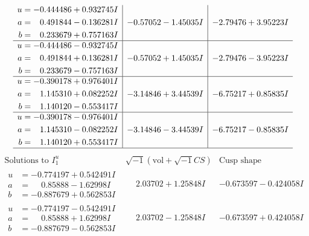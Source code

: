 \documentclass[1p]{elsarticle_modified}
\theoremstyle{definition}
\newcommand{\I}{\sqrt{-1}}
\begin{document}
$$\begin{array}{c|c|c}
\begin{aligned}
u &= -0.444486 + 0.932745 I \\
a &= \phantom{-}0.491844 - 0.136281 I \\
b &= \phantom{-}0.233679 + 0.757163 I\end{aligned}
 & -0.57052 - 1.45035 I & -2.79476 + 3.95223 I \\ \hline\begin{aligned}
u &= -0.444486 - 0.932745 I \\
a &= \phantom{-}0.491844 + 0.136281 I \\
b &= \phantom{-}0.233679 - 0.757163 I\end{aligned}
 & -0.57052 + 1.45035 I & -2.79476 - 3.95223 I \\ \hline\begin{aligned}
u &= -0.390178 + 0.976401 I \\
a &= \phantom{-}1.145310 + 0.082252 I \\
b &= \phantom{-}1.140120 - 0.553417 I\end{aligned}
 & -3.14846 + 3.44539 I & -6.75217 + 0.85835 I \\ \hline\begin{aligned}
u &= -0.390178 - 0.976401 I \\
a &= \phantom{-}1.145310 - 0.082252 I \\
b &= \phantom{-}1.140120 + 0.553417 I\end{aligned}
 & -3.14846 - 3.44539 I & -6.75217 - 0.85835 I\\
 \hline 
 \end{array}$$\newpage$$\begin{array}{c|c|c}  
\text{Solutions to }I^u_{1}& \I (\text{vol} + \sqrt{-1}CS) & \text{Cusp shape}\\
 \hline 
\begin{aligned}
u &= -0.774197 + 0.542491 I \\
a &= \phantom{-}0.85888 - 1.62998 I \\
b &= -0.887679 + 0.562853 I\end{aligned}
 & \phantom{-}2.03702 + 1.25848 I & -0.673597 - 0.424058 I \\ \hline\begin{aligned}
u &= -0.774197 - 0.542491 I \\
a &= \phantom{-}0.85888 + 1.62998 I \\
b &= -0.887679 - 0.562853 I\end{aligned}
 & \phantom{-}2.03702 - 1.25848 I & -0.673597 + 0.424058 I \\ \hline\begin{aligned}

\end{aligned}
\end{array}$$
\end{document}
